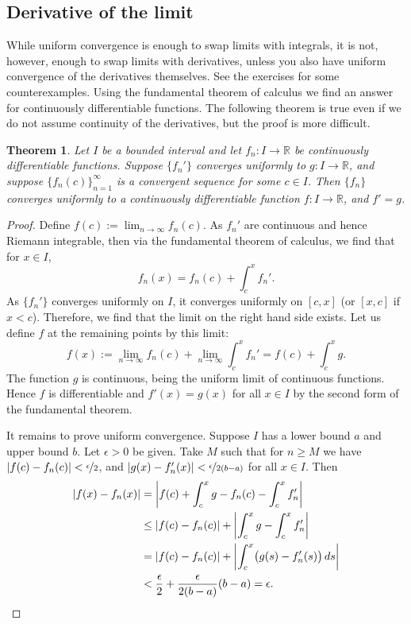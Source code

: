 \documentclass[12pt]{book}
\newcommand{\abs}[1]{\left\lvert {#1} \right\rvert}
\newcommand{\R}{{\mathbb{R}}}
\theoremstyle{plain}
\newtheorem{thm}{Theorem}[section]
\theoremstyle{remark}
\theoremstyle{definition}
\theoremstyle{exercise}
\theoremstyle{example}
\begin{document}
\subsection{Derivative of the limit}

While uniform convergence is enough to swap limits with integrals, it is not,
however, enough to swap limits with derivatives, unless you also have
uniform convergence of the derivatives themselves.
See the exercises for some counterexamples.  Using 
the fundamental theorem of calculus we find an answer for continuously
differentiable functions.  The following theorem is true even if 
we do not assume continuity of the derivatives, but the proof is more
difficult.

\begin{thm} \label{thm:dersconverge}
Let $I$ be a bounded interval and let
$f_n \colon I \to \R$ be continuously differentiable functions.
Suppose $\{ f_n' \}$ converges uniformly to $g \colon I \to \R$,
and suppose $\{ f_n(c) \}_{n=1}^\infty$ is a
convergent sequence for some $c \in I$.  Then $\{ f_n \}$ converges uniformly to 
a continuously differentiable function $f \colon I \to \R$, and $f' = g$.
\end{thm}

\begin{proof}
Define $f(c) := \lim_{n\to \infty} f_n(c)$.
As $f_n'$ are continuous and hence Riemann integrable,
then
via the fundamental theorem of calculus, we find that for $x \in I$,
\begin{equation*}
f_n(x) = f_n(c) + \int_c^x f_n' .
\end{equation*}
As $\{ f_n' \}$ converges uniformly on $I$, it converges uniformly
on $[c,x]$ (or $[x,c]$ if $x < c$).
Therefore, we find that the limit on the right hand side exists.
Let us define $f$ at the remaining points by this limit:
\begin{equation*}
f(x) :=
\lim_{n\to\infty} f_n(c) + \lim_{n\to\infty} \int_c^x f_n'
=
f(c) + \int_c^x g .
\end{equation*}
The function $g$ is continuous, being the uniform limit of continuous
functions.  Hence $f$ is differentiable and $f'(x) = g(x)$ for all $x \in I$
by the second form of the fundamental theorem.

It remains to prove
uniform convergence.
Suppose $I$ has a lower bound $a$ and upper bound $b$.
Let $\epsilon > 0$ be given.  Take $M$
such that for $n \geq M$ we have
$\abs{f(c)-f_n(c)} < \nicefrac{\epsilon}{2}$,
and
$\abs{g(x)-f_n'(x)} < \nicefrac{\epsilon}{2(b-a)}$
for all $x \in I$.  Then
\begin{equation*}
\begin{split}
\abs{f(x) - f_n(x)} & =
\abs{f(c) + \int_c^x g - f_n(c) - \int_c^x f_n'}
\\
& \leq
\abs{f(c) - f_n(c)} + \abs{\int_c^x g - \int_c^x f_n'}
\\
& =
\abs{f(c) - f_n(c)} + \abs{\int_c^x \bigl(g(s) - f_n'(s)\bigr) \, ds}
\\
& <
\frac{\epsilon}{2}
+
\frac{\epsilon}{2(b-a)}
(b-a)
=\epsilon. \qedhere
\end{split}
\end{equation*}
\end{proof}
\end{document}
